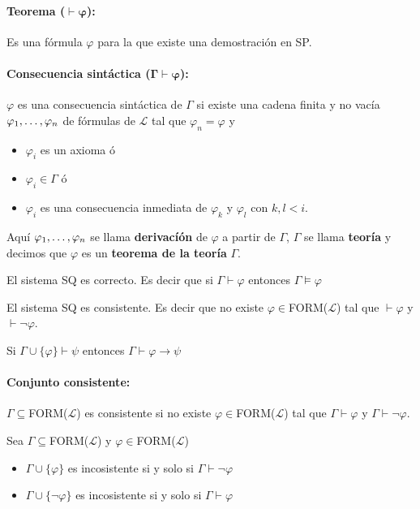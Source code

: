 \paragraph{Teorema ($\bm{\vdash\varphi}$):} Es una fórmula $\varphi$ para la que existe una demostración en SP. 

\paragraph{Consecuencia sintáctica ($\bm{\Gamma\vdash\varphi}$):} $\varphi$ es una consecuencia sintáctica de $\Gamma$ si existe una cadena finita y no vacía $\varphi_1,\dots, \varphi_{n}$ de fórmulas de $\mathcal{L}$ tal que $\varphi_n = \varphi$ y
\begin{itemize}
	\item $\varphi_i$ es un axioma ó
	\item $\varphi_i\in\Gamma$ ó
	\item $\varphi_i$ es una consecuencia inmediata de $\varphi_k$ y $\varphi_l$ con $k,l < i$.
\end{itemize}

Aquí $\varphi_1,\dots, \varphi_{n}$ se llama \textbf{derivacíón} de $\varphi$ a partir de $\Gamma$, $\Gamma$ se llama \textbf{teoría} y decimos que $\varphi$ es un \textbf{teorema de la teoría} $\Gamma$.

\begin{teorema}\label{teorema::correctitudSQ}
	El sistema SQ es correcto. Es decir que si $\Gamma\vdash\varphi$ entonces $\Gamma\vDash\varphi$
\end{teorema}

\begin{teorema}\label{teorema::consistenciaSQ}
	El sistema SQ es consistente. Es decir que no existe $\varphi\in$FORM($\mathcal{L}$) tal que $\vdash\varphi$ y $\vdash\lnot\varphi$.
\end{teorema}

\begin{teorema}
	Si $\Gamma\cup\{\varphi\}\vdash\psi$ entonces $\Gamma\vdash\varphi\to\psi$
\end{teorema}


\paragraph{Conjunto consistente:} $\Gamma\subseteq$FORM($\mathcal{L}$) es consistente si no existe $\varphi\in$FORM($\mathcal{L}$) tal que $\Gamma\vdash\varphi$ y $\Gamma\vdash\lnot\varphi$.

\begin{proposicion}
	Sea $\Gamma\subseteq$FORM($\mathcal{L}$) y $\varphi\in$FORM($\mathcal{L}$)
	\begin{itemize}
		\item $\Gamma\cup\{\varphi\}$ es incosistente si y solo si $\Gamma\vdash\lnot\varphi$
		\item $\Gamma\cup\{\lnot\varphi\}$ es incosistente si y solo si $\Gamma\vdash\varphi$
	\end{itemize}
\end{proposicion}

